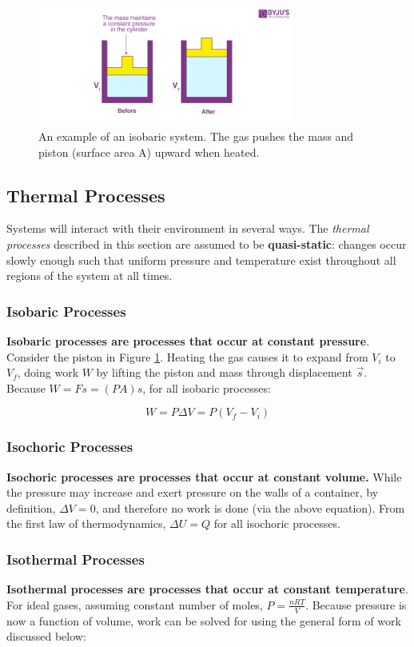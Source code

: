 \documentclass[12pt, a4paper]{article}
\theoremstyle{definition}
\begin{document}
\begin{figure}[t]
    \centering
    \includegraphics[width=0.75\textwidth]{isobaric.png}
    \caption{An example of an isobaric system. The gas pushes the mass and piston (surface area A) upward when heated.}
    \label{fig:isobaric}
\end{figure}

\subsection{Thermal Processes}
Systems will interact with their environment in several ways.
The \textit{thermal processes} described in this section are assumed to be \textbf{quasi-static}: changes occur slowly enough such that uniform pressure and temperature exist throughout all regions of the system at all times.

\subsubsection{Isobaric Processes}
\textbf{Isobaric processes are processes that occur at constant pressure}.
Consider the piston in Figure \ref{fig:isobaric}. 
Heating the gas causes it to expand from $V_i$ to $V_f$, doing work $W$ by lifting the piston and mass through displacement $\vec{s}$.
Because $W = Fs = (PA)s$, for all isobaric processes:

\[W = P\Delta V = P(V_f - V_i)\]

\subsubsection{Isochoric Processes}
\textbf{Isochoric processes are processes that occur at constant volume.}
While the pressure may increase and exert pressure on the walls of a container, by definition, $\Delta V = 0$, and therefore no work is done (via the above equation).
From the first law of thermodynamics, $\Delta U = Q$ for all isochoric processes.

\subsubsection{Isothermal Processes}
\textbf{Isothermal processes are processes that occur at constant temperature}.
For ideal gases, assuming constant number of moles, $P = \frac{nRT}{V}$.
Because pressure is now a function of volume, work can be solved for using the general form of work discussed below:
\end{document}
